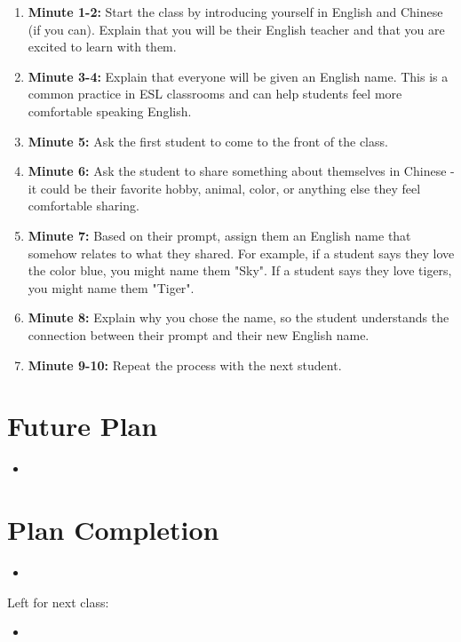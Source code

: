 \documentclass[12pt]{article}
\begin{document}
\begin{enumerate}[leftmargin=*]
\item \textbf{Minute 1-2:} Start the class by introducing yourself in English and Chinese (if you can). Explain that you will be their English teacher and that you are excited to learn with them. 

\item \textbf{Minute 3-4:} Explain that everyone will be given an English name. This is a common practice in ESL classrooms and can help students feel more comfortable speaking English. 

\item \textbf{Minute 5:} Ask the first student to come to the front of the class. 

\item \textbf{Minute 6:} Ask the student to share something about themselves in Chinese - it could be their favorite hobby, animal, color, or anything else they feel comfortable sharing. 

\item \textbf{Minute 7:} Based on their prompt, assign them an English name that somehow relates to what they shared. For example, if a student says they love the color blue, you might name them "Sky". If a student says they love tigers, you might name them "Tiger". 

\item \textbf{Minute 8:} Explain why you chose the name, so the student understands the connection between their prompt and their new English name. 

\item \textbf{Minute 9-10:} Repeat the process with the next student. 
\end{enumerate}



\section{Future Plan}
\begin{itemize}
    \item 

\end{itemize}
\section{Plan Completion}
\begin{itemize}
    \item 
\end{itemize}
Left for next class: 
\begin{itemize}
    \item 
\end{itemize}
\end{document}
